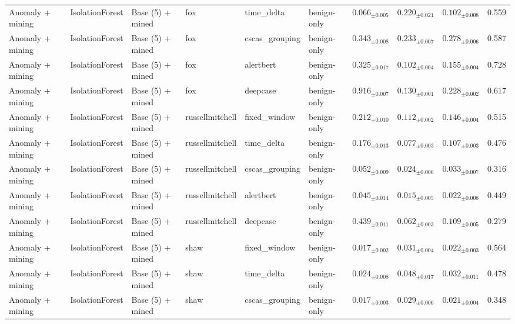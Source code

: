 \begin{longtable}{llllllcccc}
\addlinespace
Anomaly + mining & IsolationForest & Base (5) + mined & fox & time\_delta & benign-only & $0.066_{\pm 0.005}$ & $0.220_{\pm 0.021}$ & $0.102_{\pm 0.008}$ & 0.559 \\
\addlinespace
Anomaly + mining & IsolationForest & Base (5) + mined & fox & cscas\_grouping & benign-only & $0.343_{\pm 0.008}$ & $0.233_{\pm 0.007}$ & $0.278_{\pm 0.006}$ & 0.587 \\
\addlinespace
Anomaly + mining & IsolationForest & Base (5) + mined & fox & alertbert & benign-only & $0.325_{\pm 0.017}$ & $0.102_{\pm 0.004}$ & $0.155_{\pm 0.004}$ & 0.728 \\
\addlinespace
Anomaly + mining & IsolationForest & Base (5) + mined & fox & deepcase & benign-only & $0.916_{\pm 0.007}$ & $0.130_{\pm 0.001}$ & $0.228_{\pm 0.002}$ & 0.617 \\
\addlinespace
Anomaly + mining & IsolationForest & Base (5) + mined & russellmitchell & fixed\_window & benign-only & $0.212_{\pm 0.010}$ & $0.112_{\pm 0.002}$ & $0.146_{\pm 0.004}$ & 0.515 \\
\addlinespace
Anomaly + mining & IsolationForest & Base (5) + mined & russellmitchell & time\_delta & benign-only & $0.176_{\pm 0.013}$ & $0.077_{\pm 0.003}$ & $0.107_{\pm 0.003}$ & 0.476 \\
\addlinespace
Anomaly + mining & IsolationForest & Base (5) + mined & russellmitchell & cscas\_grouping & benign-only & $0.052_{\pm 0.009}$ & $0.024_{\pm 0.006}$ & $0.033_{\pm 0.007}$ & 0.316 \\
\addlinespace
Anomaly + mining & IsolationForest & Base (5) + mined & russellmitchell & alertbert & benign-only & $0.045_{\pm 0.014}$ & $0.015_{\pm 0.005}$ & $0.022_{\pm 0.008}$ & 0.449 \\
\addlinespace
Anomaly + mining & IsolationForest & Base (5) + mined & russellmitchell & deepcase & benign-only & $0.439_{\pm 0.011}$ & $0.062_{\pm 0.003}$ & $0.109_{\pm 0.005}$ & 0.279 \\
\addlinespace
Anomaly + mining & IsolationForest & Base (5) + mined & shaw & fixed\_window & benign-only & $0.017_{\pm 0.002}$ & $0.031_{\pm 0.004}$ & $0.022_{\pm 0.003}$ & 0.564 \\
\addlinespace
Anomaly + mining & IsolationForest & Base (5) + mined & shaw & time\_delta & benign-only & $0.024_{\pm 0.008}$ & $0.048_{\pm 0.017}$ & $0.032_{\pm 0.011}$ & 0.478 \\
\addlinespace
Anomaly + mining & IsolationForest & Base (5) + mined & shaw & cscas\_grouping & benign-only & $0.017_{\pm 0.003}$ & $0.029_{\pm 0.006}$ & $0.021_{\pm 0.004}$ & 0.348 \\

\end{longtable}
